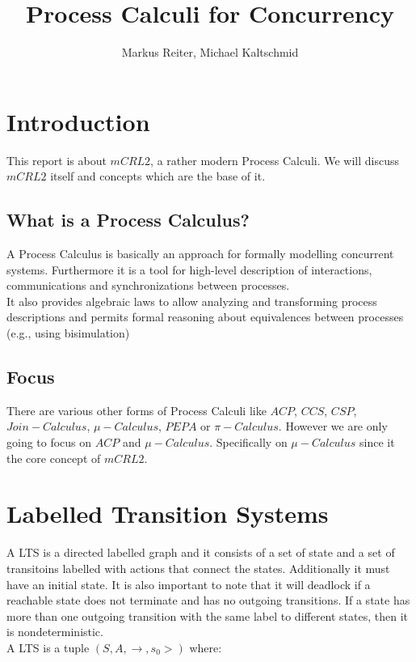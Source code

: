 \documentclass{clseminar}
\title{Process Calculi for Concurrency}
\author{Markus Reiter, Michael Kaltschmid}
\begin{document}
  \abstract{}
  \maketitle
  \newpage
  \tableofcontents

  \section{Introduction}
  This report is about $mCRL2$, a rather modern Process Calculi. We will discuss $mCRL2$ itself and concepts which are the base of it.
  \subsection{What is a Process Calculus?}
  A Process Calculus is basically an approach for formally modelling concurrent systems.
  Furthermore it is a tool for high-level description of interactions, communications and synchronizations between processes. \\
  It also provides algebraic laws to allow analyzing and transforming process descriptions and permits formal reasoning about equivalences between processes (e.g., using bisimulation) \\

  \subsection{Focus}
  There are various other forms of Process Calculi like $ACP$, $CCS$, $CSP$, $Join-Calculus$, $\mu-Calculus$, $PEPA$ or $\pi-Calculus$. However we are only going to focus on $ACP$ and $\mu-Calculus$. Specifically on $\mu-Calculus$ since it the core concept of $mCRL2$.

  \section{Labelled Transition Systems}
  A LTS is a directed labelled graph and it consists of a set of state and a set of transitoins labelled with actions that connect the states. Additionally it must have an initial state. It is also important to note that it will deadlock if a reachable state does not terminate and has no outgoing
  transitions. If a state has more than one outgoing transition with the same label to different states, then it is nondeterministic. \\[12pt]
  A LTS is a tuple $(S, A, \to,s_0>)$ where: \\
\end{document}
